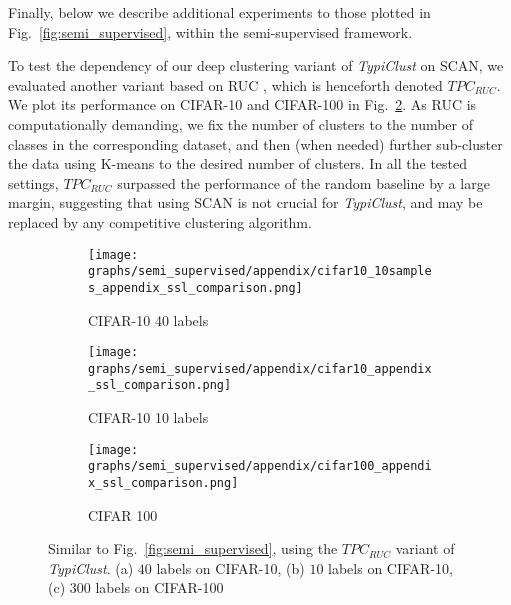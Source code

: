 \documentclass{article}
\begin{document}
Finally, below we describe additional experiments to those plotted in Fig.~\ref{fig:semi_supervised}, within the semi-supervised framework.

To test the dependency of our deep clustering variant of \emph{TypiClust} on SCAN, we evaluated another variant based on RUC \citep{park2021improving}, which is henceforth denoted $TPC_{RUC}$. We plot its performance on CIFAR-10 and CIFAR-100 in Fig.~\ref{fig:app:semi_supervised}. As RUC is computationally demanding, we fix the number of clusters to the number of classes in the corresponding dataset, and then (when needed) further sub-cluster the data using K-means to the desired number of clusters. In all the tested settings, $TPC_{RUC}$ surpassed the performance of the random baseline by a large margin, suggesting that using SCAN is not crucial for \emph{TypiClust}, and may be replaced by any competitive clustering algorithm.


\begin{figure}[htb!]
\begin{center}
    \begin{subfigure}{.2\textwidth}
      \centering
      \texttt{[image: graphs/semi\_supervised/appendix/cifar10\_10samples\_appendix\_ssl\_comparison.png]}
    \vspace{-0.75cm}
    \caption{CIFAR-10 40 labels}
    \label{fig:app:ssl_cifar_10_with_40_examples}
    \end{subfigure}
    \begin{subfigure}{.2\textwidth}
      \centering
      \texttt{[image: graphs/semi\_supervised/appendix/cifar10\_appendix\_ssl\_comparison.png]}
    \vspace{-0.75cm}
    \caption{CIFAR-10 10 labels}
\end{subfigure}
    \begin{subfigure}{.2\textwidth}
      \centering
      \texttt{[image: graphs/semi\_supervised/appendix/cifar100\_appendix\_ssl\_comparison.png]}
    \vspace{-0.75cm}
    \caption{CIFAR 100}
\end{subfigure}
\caption{Similar to Fig.~\ref{fig:semi_supervised}, using the $TPC_{RUC}$ variant of \emph{TypiClust}. (a) $40$ labels on CIFAR-10, (b) $10$ labels on CIFAR-10, (c) $300$ labels on CIFAR-100}
\label{fig:app:semi_supervised}
\vspace{-0.3cm}
\end{center}
\end{figure}
\end{document}
